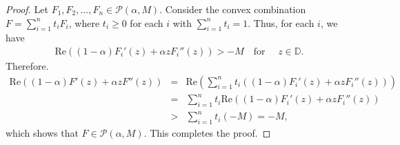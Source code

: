 \documentclass[10pt,a4paper]{amsart}
\newcommand{\beas}{\begin{eqnarray*}}
\newcommand{\eeas}{\end{eqnarray*}}
\begin{document}
\begin{proof}
Let $F_1, F_2, \ldots, F_n \in \mathcal{P}(\alpha, M)$. Consider the convex combination $F=\sum_{i=1}^n t_i F_i$, where $t_i\geq 0$ for each $i$ with $\sum_{i=1}^n t_i=1$.
Thus, for each $i$, we have
\beas \text{Re}\left((1-\alpha)F_i'(z) + \alpha z F_i''(z)\right) > -M \quad \text{for }\quad z \in \mathbb{D}.\eeas
Therefore.
\beas
\text{Re}\left((1-\alpha)F'(z) + \alpha z F''(z)\right)
&= & \text{Re}\left(\sum_{i=1}^n t_i \left((1-\alpha)F_i'(z) + \alpha z F_i''(z)\right)\right) \\[1mm]
&=& \sum_{i=1}^n t_i  \text{Re}\left((1-\alpha)F_i'(z) + \alpha z F_i''(z)\right) \\[1mm]
&>& \sum_{i=1}^n t_i (-M) = -M,
\eeas
which shows that $F \in \mathcal{P}(\alpha, M)$. This completes the proof.
\end{proof}
\end{document}
